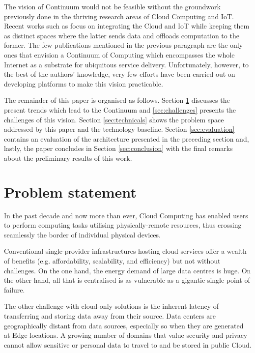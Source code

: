 The vision of Continuum would not be feasible without the groundwork previously done in the thriving research areas of Cloud Computing and IoT. 
Recent works such as \cite{botta2016integration} focus on integrating the Cloud and IoT while keeping them as distinct spaces where the latter sends data and offloads computation to the former.
The few publications mentioned in the previous paragraph are the only ones that envision a Continuum of Computing which encompasses the whole Internet as a substrate for ubiquitous service delivery. 
Unfortunately, however, to the best of the authors' knowledge, very few efforts have been carried out on developing platforms to make this vision practicable.

The remainder of this paper is organised as follows. Section \ref{sec:problem} discusses the present trends which lead to the Continuum and \ref{sec:challenges} presents the challenges of this vision. Section \ref{sec:technicals} shows the problem space addressed by this paper and the technology baseline. Section \ref{sec:evaluation} contains an evaluation of the architecture presented in the preceding section and, lastly, the paper concludes in Section \ref{sec:conclusion} with the final remarks about the preliminary results of this work.

\section{Problem statement}
\label{sec:problem}

In the past decade and now more than ever, Cloud Computing \cite{mell2011nist} has enabled users to perform computing tasks utilising physically-remote resources, thus crossing seamlessly the border of individual physical devices.

Conventional single-provider infrastructures hosting cloud services offer a wealth of benefits (e.g. affordability, scalability, and efficiency) but not without challenges. On the one hand, the energy demand of large data centres is huge. On the other hand, all that is centralised is as vulnerable as a gigantic single point of failure.

The other challenge with cloud-only solutions is the inherent latency of transferring and storing data away from their source. 
Data centers are geographically distant from data sources, especially so when they are generated at Edge locations. 
A growing number of domains that value security and privacy cannot allow sensitive or personal data to travel to and be stored in public Cloud.


